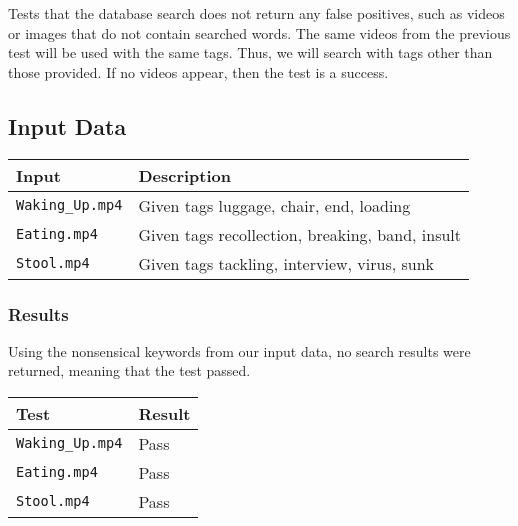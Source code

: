 \documentclass{scrreprt}
\begin{document}
Tests that the database search does not return any false positives, such as
videos or images that do not contain searched words. The same videos from the
previous test will be used with the same tags. Thus, we will search with tags
other than those provided. If no videos appear, then the test is a success.

\subsection{Input Data}

\begin{table}[H]
        \centering
        \begin{tabular}{p{3cm}p{6cm}}
                \hline\hline
                Input & Description\\
                \hline\hline
                \verb|Waking_Up.mp4| &  Given tags luggage, chair, end, loading\\
                \hline
                \verb|Eating.mp4| &  Given tags recollection, breaking, band, insult\\
                \hline
                \verb|Stool.mp4| &  Given tags tackling, interview, virus, sunk\\
                \hline
        \end{tabular}
\end{table}

\subsubsection{Results}

Using the nonsensical keywords from our input data, no search results were
returned, meaning that the test passed.

\begin{table}[H]
        \centering
        \begin{tabular}{||p{2.5cm}|p{2.5cm}||}
                \hline
                \textbf Test & \textbf Result\\
                \hline\hline
                \verb|Waking_Up.mp4| &  Pass \\
                \hline
                \verb|Eating.mp4| &  Pass\\
                \hline
                \verb|Stool.mp4| &  Pass\\
                \hline
        \end{tabular}
\end{table}
\end{document}

